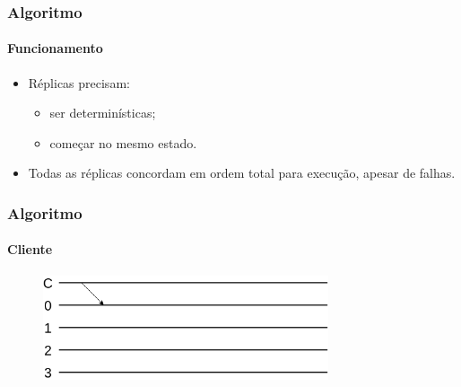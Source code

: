 \documentclass{beamer}
\begin{document}
\begin{frame}
  \frametitle{Algoritmo}
  \framesubtitle{Funcionamento}

  \begin{itemize}
    \item
      Réplicas precisam:
      \begin{itemize}
        \item
          ser determinísticas;

        \item
          começar no mesmo estado.
      \end{itemize}

    \item
      Todas as réplicas concordam em ordem total para execução, apesar de falhas.
  \end{itemize}
\end{frame}

\begin{frame}
  \frametitle{Algoritmo}
  \framesubtitle{Cliente}

  \begin{figure}
    \includegraphics[width=0.75\textwidth]{images/algo01}
  \end{figure}
\end{frame}
\end{document}
